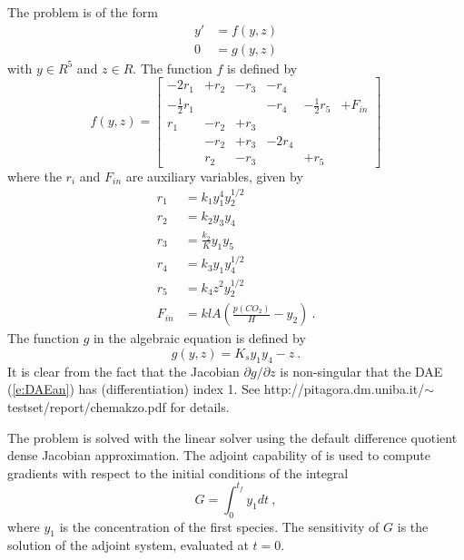 The problem is of the form
\begin{equation}\label{e:DAEan}
\begin{split}
  y' &= f(y, z) \\
  0  &= g(y, z) 
\end{split}
\end{equation}
with $y \in R^5$ and $z \in R$. The function $f$ is defined by
\begin{equation*}
  f(y, z) = \begin{bmatrix}
    -2r_1           &+r_2 &-r_3 &-r_4  &                &        \\
    -\frac{1}{2}r_1 &     &     &-r_4  &-\frac{1}{2}r_5 &+F_{in} \\
    r_1             &-r_2 &+r_3 &      &                &        \\
                    &-r_2 &+r_3 &-2r_4 &                &        \\
                    &r_2  &-r_3 &      &+r_5            &        
  \end{bmatrix}
\end{equation*}
where the $r_i$ and $F_{in}$ are auxiliary variables, given by
\begin{equation*}
  \begin{split}
    r_1 & = k_1 y_1^4 y_2^{1/2} \\
    r_2 & = k_2 y_3 y_4 \\
    r_3 & = \frac{k_2}{K} y_1 y_5 \\
    r_4 & = k_3 y_1 y_4^{1/2} \\
    r_5 & = k_4 z^2 y_2^{1/2} \\
    F_{in} & = klA \left( \frac{p(CO_2)}{H} - y_2 \right) ~.
  \end{split}
\end{equation*}
The function $g$ in the algebraic equation is defined by
\begin{equation*}
  g(y, z) = K_s y_1 y_4 - z ~.
\end{equation*}
It is clear from the fact that the Jacobian $\partial g / \partial z$ is non-singular
that the DAE (\ref{e:DAEan}) has (differentiation) index 1. 
See http://pitagora.dm.uniba.it/$\sim$testset/report/chemakzo.pdf for details.


The problem is solved with the {\idadense} linear solver using the
default difference quotient dense Jacobian approximation.
The adjoint capability of {\idas} is used to compute gradients with
respect to the initial conditions of the integral
\begin{equation*}
  G = \int_0^{t_f} y_1 dt ~,
\end{equation*}
where $y_1$ is the concentration of the first species.  The sensitivity
of $G$ is the solution of the adjoint system, evaluated at $t = 0$.

